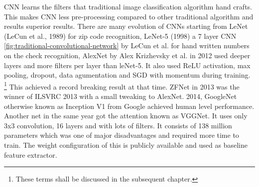 \newpara CNN learns the filters that traditional image classification algorithm hand crafts. This makes CNN less pre-processing compared to other traditional algorithm and results superior results. There are many evolution of CNNs starting from LeNet (LeCun et al., 1989) for zip code recognition, LeNet-5 (1998) a 7 layer CNN \ref{fig:traditional-convolutional-network} by LeCun et al. for hand written numbers on the check recognition, AlexNet by Alex Krizhevsky et al. in 2012 used deeper layers and more filters per layer than leNet-5. It also used ReLU activation, max pooling, dropout, data agumentation and SGD with momentum during training. \footnote{These terms shall be discussed in the subsequent chapter.} This achieved a record breaking result at that time. ZFNet in 2013 was the winner of ILSVRC 2013 with a small tweaking to AlexNet. 2014, GoogleNet otherwise known as Inception V1 from Google achieved human level performance. Another net in the same year got the attention known as VGGNet. It uses only 3x3 convolution, 16 layers and with lots of filters. It consists of 138 million parameters which was one of major disadvantages and required more time to train. The weight configuration of this is publicly available and used as baseline feature extractor.


